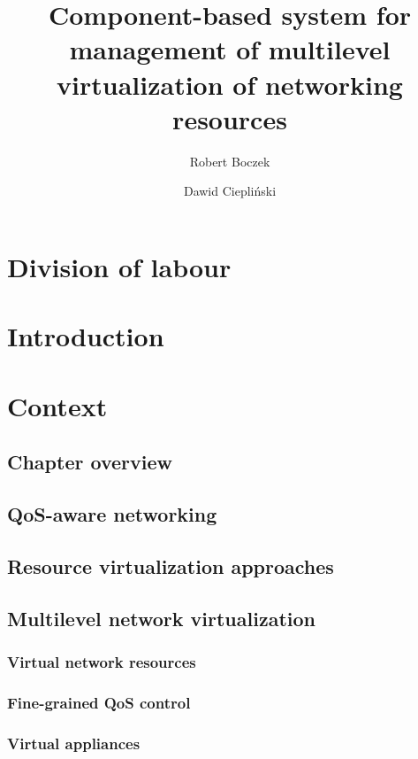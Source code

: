 \documentclass[11pt]{book}
\title{Component-based system for management of multilevel virtualization of networking resources}
\author{Robert Boczek \and Dawid Ciepliński}
\begin{document}
  \maketitle
    
  \tableofcontents

  \chapter*{Division of labour} %
	

  \chapter{Introduction}



  \chapter{Context}  %

    \section*{Chapter overview}


    \section{QoS-aware networking}


    \section{Resource virtualization approaches}


    \section{Multilevel network virtualization}

      \subsection{Virtual network resources}

      \subsection{Fine-grained QoS control}

      \subsection{Virtual appliances}
\end{document}
